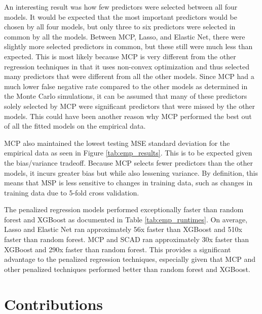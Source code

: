 \documentclass{article}
\begin{document}
An interesting result was how few predictors were selected between all four models. It would be expected that the most important predictors would be chosen by all four models, but only three to six predictors were selected in common by all the models. Between MCP, Lasso, and Elastic Net, there were slightly more selected predictors in common, but these still were much less than expected. This is most likely because MCP is very different from the other regression techniques in that it uses non-convex optimization and thus selected many predictors that were different from all the other models. Since MCP had a much lower false negative rate compared to the other models as determined in the Monte Carlo simulations, it can be assumed that many of these predictors solely selected by MCP were significant predictors that were missed by the other models. This could have been another reason why MCP performed the best out of all the fitted models on the empirical data. 

MCP also maintained the lowest testing MSE standard deviation for the empirical data as seen in Figure \ref{tab:emp_results}. This is to be expected given the bias/variance tradeoff. Because MCP selects fewer predictors than the other models, it incurs greater bias but while also lessening variance. By definition, this means that MSP is less sensitive to changes in training data, such as changes in training data due to 5-fold cross validation. 

The penalized regression models performed exceptionally faster than random forest and XGBoost as documented in Table \ref{tab:emp_runtimes}. On average, Lasso and Elastic Net ran approximately 56x faster than XGBoost and 510x faster than random forest. MCP and SCAD ran approximately 30x faster than XGBoost and 290x faster than random forest. This provides a significant advantage to the penalized regression techniques, especially given that MCP and other penalized techniques performed better than random forest and XGBoost. 

\section{Contributions}
\end{document}
